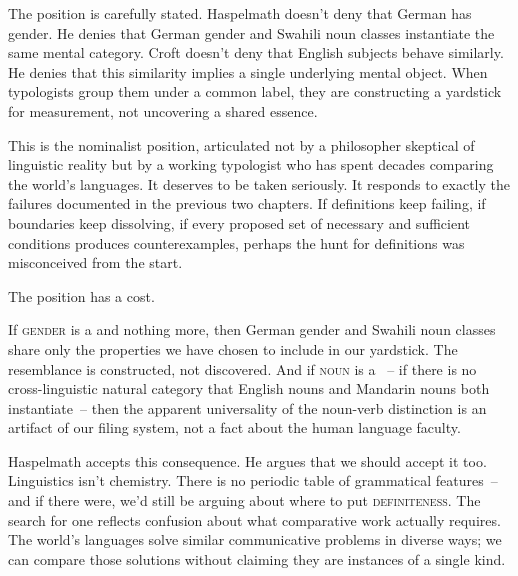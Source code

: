 The position is carefully stated. Haspelmath doesn't deny that German has gender. He denies that German gender and Swahili noun classes instantiate the same mental category. Croft doesn't deny that English subjects behave similarly. He denies that this similarity implies a single underlying mental object. When typologists group them under a common label, they are constructing a yardstick for measurement, not uncovering a shared essence.

This is the nominalist position, articulated not by a philosopher skeptical of linguistic reality but by a working typologist who has spent decades comparing the world's languages. It deserves to be taken seriously. It responds to exactly the failures documented in the previous two chapters. If definitions keep failing, if boundaries keep dissolving, if every proposed set of necessary and sufficient conditions produces counterexamples, perhaps the hunt for definitions was misconceived from the start.

The position has a cost.

If \textsc{gender} is a  and nothing more, then German gender and Swahili noun classes share only the properties we have chosen to include in our yardstick. The resemblance is constructed, not discovered. And if \textsc{noun} is a ~-- if there is no cross-linguistic natural category that English nouns and Mandarin nouns both instantiate~-- then the apparent universality of the noun-verb distinction is an artifact of our filing system, not a fact about the human language faculty.

Haspelmath accepts this consequence. He argues that we should accept it too. Linguistics isn't chemistry. There is no periodic table of grammatical features~-- and if there were, we'd still be arguing about where to put \textsc{definiteness}. The search for one reflects confusion about what comparative work actually requires. The world's languages solve similar communicative problems in diverse ways; we can compare those solutions without claiming they are instances of a single kind.


